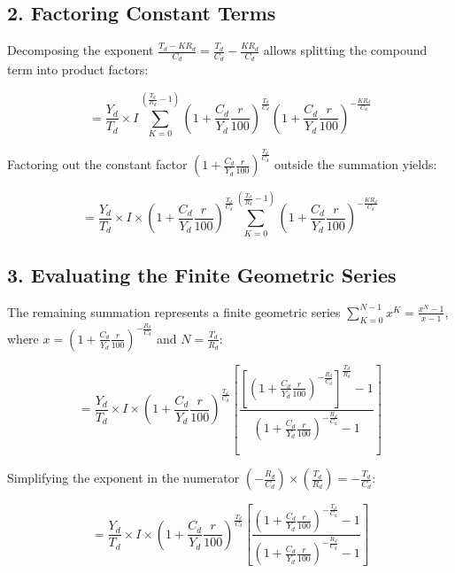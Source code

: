\documentclass[11pt,a4paper]{article}
\begin{document}
\subsection*{2. Factoring Constant Terms}
Decomposing the exponent $\frac{T_d - K R_d}{C_d} = \frac{T_d}{C_d} - \frac{K R_d}{C_d}$ allows splitting the compound term into product factors:

\begin{equation}
= \frac{Y_d}{T_d} \times I \sum_{K=0}^{\left(\frac{T_d}{R_d}-1\right)} \left(1 + \frac{C_d}{Y_d} \frac{r}{100}\right)^{\frac{T_d}{C_d}} \left(1 + \frac{C_d}{Y_d} \frac{r}{100}\right)^{-\frac{K R_d}{C_d}}
\end{equation}

Factoring out the constant factor $\left(1 + \frac{C_d}{Y_d} \frac{r}{100}\right)^{\frac{T_d}{C_d}}$ outside the summation yields:

\begin{equation}
= \frac{Y_d}{T_d} \times I \times \left(1 + \frac{C_d}{Y_d} \frac{r}{100}\right)^{\frac{T_d}{C_d}} \sum_{K=0}^{\left(\frac{T_d}{R_d}-1\right)} \left(1 + \frac{C_d}{Y_d} \frac{r}{100}\right)^{-\frac{K R_d}{C_d}}
\end{equation}

\subsection*{3. Evaluating the Finite Geometric Series}
The remaining summation represents a finite geometric series $\sum_{K=0}^{N-1} x^K = \frac{x^N - 1}{x - 1}$, where $x = \left(1 + \frac{C_d}{Y_d} \frac{r}{100}\right)^{-\frac{R_d}{C_d}}$ and $N = \frac{T_d}{R_d}$:

\begin{equation}
= \frac{Y_d}{T_d} \times I \times \left(1 + \frac{C_d}{Y_d} \frac{r}{100}\right)^{\frac{T_d}{C_d}} \left[ \frac{\left[\left(1 + \frac{C_d}{Y_d} \frac{r}{100}\right)^{-\frac{R_d}{C_d}}\right]^{\frac{T_d}{R_d}} - 1}{\left(1 + \frac{C_d}{Y_d} \frac{r}{100}\right)^{-\frac{R_d}{C_d}} - 1} \right]
\end{equation}

Simplifying the exponent in the numerator $\left(-\frac{R_d}{C_d}\right) \times \left(\frac{T_d}{R_d}\right) = -\frac{T_d}{C_d}$:

\begin{equation}
= \frac{Y_d}{T_d} \times I \times \left(1 + \frac{C_d}{Y_d} \frac{r}{100}\right)^{\frac{T_d}{C_d}} \left[ \frac{\left(1 + \frac{C_d}{Y_d} \frac{r}{100}\right)^{-\frac{T_d}{C_d}} - 1}{\left(1 + \frac{C_d}{Y_d} \frac{r}{100}\right)^{-\frac{R_d}{C_d}} - 1} \right]
\end{equation}
\end{document}
